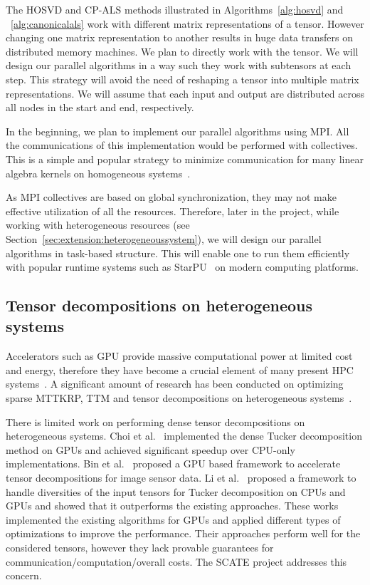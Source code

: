 \documentclass[a4paper,11pt]{article}
\newcommand{\todo}[1]{{\color{red}\rule[-.1cm]{.4cm}{.4cm}~~{
			\color{red}{TODO: #1}}}\xspace}
\begin{document}
	The HOSVD and CP-ALS methods illustrated in Algorithms~\ref{alg:hosvd} and ~\ref{alg:canonicalals} work with different matrix representations of a tensor. However changing one matrix representation to another results in huge data transfers on distributed memory machines. We plan to directly work with the tensor. We will design our parallel algorithms in a way such they work with subtensors at each step. This strategy will avoid the need of reshaping a tensor into multiple matrix representations. We will assume that each input and output are distributed across all nodes in the start and end, respectively.
	
	In the beginning, we plan to implement our parallel algorithms using MPI. All the communications of this implementation would be performed with collectives. This is a simple and popular strategy to minimize communication for many linear algebra kernels on homogeneous systems~\cite{ABK-IPDPS-2016,BKK-TOMS-2020}.
	
	
	
	As MPI collectives are based on global synchronization, they may not make effective utilization of all the resources. Therefore, later in the project, while working with heterogeneous resources (see Section~\ref{sec:extension:heterogeneoussystem}), we will design our parallel algorithms in task-based structure. This will enable one to run them efficiently with popular runtime systems such as StarPU~\cite{ATNW-CCPE-2011} on modern computing platforms.
	  
	
	
	 
	
	\subsection{Tensor decompositions on heterogeneous systems}
	\label{sec:heterogeneous}
	
	Accelerators such as GPU provide massive computational power at limited cost and energy, therefore they have become a crucial element of many present HPC systems~\cite{top500}. A significant amount of research has been conducted on optimizing sparse MTTKRP, TTM and tensor decompositions on heterogeneous systems~\cite{NLSVS-IPDPS-2019,LWSD-CLUSTER-2017,parti}. 
	
	
	There is limited work on performing dense tensor decompositions on heterogeneous systems. Choi et al.~\cite{CLC-SC-2018} implemented the dense Tucker decomposition method on GPUs and achieved significant speedup over CPU-only implementations. Bin et al.~\cite{BKL-SENSORS-2020} proposed a GPU based framework to accelerate tensor decompositions for image sensor data. Li et al.~\cite{li2020atucker} proposed a framework to handle diversities of the input tensors for Tucker decomposition on CPUs and GPUs and showed that it outperforms the existing approaches. These works implemented the existing algorithms for GPUs and applied different types of optimizations to improve the performance. Their approaches perform well for the considered tensors, however they lack provable guarantees for communication/computation/overall costs. The SCATE project addresses this concern.
	
\end{document}
